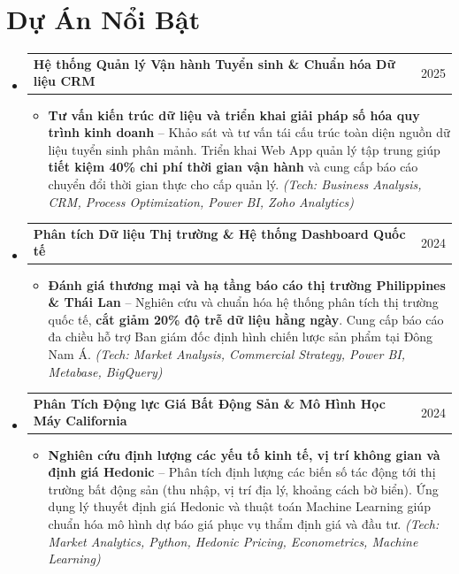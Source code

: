 \documentclass[letterpaper,11pt]{article}
\makeatletter
\newcommand{\resumeItem}[1]{
  \item\small{
    {#1 \vspace{1pt}}
  }
}
\newcommand{\resumeProjectHeading}[2]{
    \vspace{2pt}\item
    \begin{tabular*}{\textwidth}{l@{\extracolsep{\fill}}r}
      \small#1 & #2 \\
    \end{tabular*}\vspace{-2pt}
}
\newcommand{\resumeSubHeadingListStart}{\begin{itemize}[leftmargin=0.15in, label={}]}
\newcommand{\resumeSubHeadingListEnd}{\end{itemize}}
\newcommand{\resumeItemListStart}{\begin{itemize}[leftmargin=0.15in, itemsep=2.5pt, topsep=2pt, parsep=1.5pt]}
\newcommand{\resumeItemListEnd}{\end{itemize}\vspace{2pt}}
\makeatother
\begin{document}
\section*{Dự Án Nổi Bật}
  \resumeSubHeadingListStart
        \resumeProjectHeading
      {\textbf{Hệ thống Quản lý Vận hành Tuyển sinh \& Chuẩn hóa Dữ liệu CRM}}{2025}
      \resumeItemListStart
        \resumeItem{\textbf{Tư vấn kiến trúc dữ liệu và triển khai giải pháp số hóa quy trình kinh doanh} -- Khảo sát và tư vấn tái cấu trúc toàn diện nguồn dữ liệu tuyển sinh phân mảnh. Triển khai Web App quản lý tập trung giúp \textbf{tiết kiệm 40\% chi phí thời gian vận hành} và cung cấp báo cáo chuyển đổi thời gian thực cho cấp quản lý. \emph{(Tech: Business Analysis, CRM, Process Optimization, Power BI, Zoho Analytics)}}
      \resumeItemListEnd
    \resumeProjectHeading
      {\textbf{Phân tích Dữ liệu Thị trường \& Hệ thống Dashboard Quốc tế}}{2024}
      \resumeItemListStart
        \resumeItem{\textbf{Đánh giá thương mại và hạ tầng báo cáo thị trường Philippines \& Thái Lan} -- Nghiên cứu và chuẩn hóa hệ thống phân tích thị trường quốc tế, \textbf{cắt giảm 20\% độ trễ dữ liệu hằng ngày}. Cung cấp báo cáo đa chiều hỗ trợ Ban giám đốc định hình chiến lược sản phẩm tại Đông Nam Á. \emph{(Tech: Market Analysis, Commercial Strategy, Power BI, Metabase, BigQuery)}}
      \resumeItemListEnd
    \resumeProjectHeading
      {\textbf{Phân Tích Động lực Giá Bất Động Sản \& Mô Hình Học Máy California}}{2024}
      \resumeItemListStart
        \resumeItem{\textbf{Nghiên cứu định lượng các yếu tố kinh tế, vị trí không gian và định giá Hedonic} -- Phân tích định lượng các biến số tác động tới thị trường bất động sản (thu nhập, vị trí địa lý, khoảng cách bờ biển). Ứng dụng lý thuyết định giá Hedonic và thuật toán Machine Learning giúp chuẩn hóa mô hình dự báo giá phục vụ thẩm định giá và đầu tư. \emph{(Tech: Market Analytics, Python, Hedonic Pricing, Econometrics, Machine Learning)}}
      \resumeItemListEnd
  \resumeSubHeadingListEnd

\end{document}
